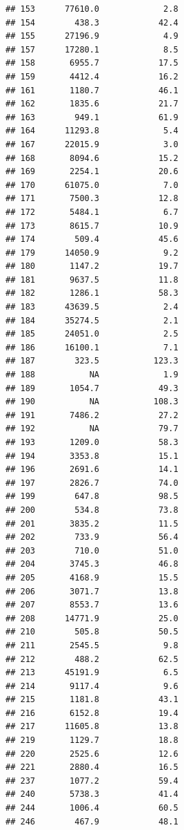 \documentclass{beamer}\usepackage{graphicx, color}
\makeatletter
\newenvironment{kframe}{%
 \def\at@end@of@kframe{}%
 \ifinner\ifhmode%
  \def\at@end@of@kframe{\end{minipage}}%
  \begin{minipage}{\columnwidth}%
 \fi\fi%
 \def\FrameCommand##1{\hskip\@totalleftmargin \hskip-\fboxsep
 \colorbox{shadecolor}{##1}\hskip-\fboxsep
     \hskip-\linewidth \hskip-\@totalleftmargin \hskip\columnwidth}%
 \MakeFramed {\advance\hsize-\width
   \@totalleftmargin\z@ \linewidth\hsize
   \@setminipage}}%
 {\par\unskip\endMakeFramed%
 \at@end@of@kframe}
\newenvironment{knitrout}{}{} %
\makeatother
\begin{document}
\begin{frame}
\begin{knitrout}
\begin{kframe}
\begin{verbatim}
## 153      77610.0             2.8
## 154        438.3            42.4
## 155      27196.9             4.9
## 157      17280.1             8.5
## 158       6955.7            17.5
## 159       4412.4            16.2
## 161       1180.7            46.1
## 162       1835.6            21.7
## 163        949.1            61.9
## 164      11293.8             5.4
## 167      22015.9             3.0
## 168       8094.6            15.2
## 169       2254.1            20.6
## 170      61075.0             7.0
## 171       7500.3            12.8
## 172       5484.1             6.7
## 173       8615.7            10.9
## 174        509.4            45.6
## 179      14050.9             9.2
## 180       1147.2            19.7
## 181       9637.5            11.8
## 182       1286.1            58.3
## 183      43639.5             2.4
## 184      35274.5             2.1
## 185      24051.0             2.5
## 186      16100.1             7.1
## 187        323.5           123.3
## 188           NA             1.9
## 189       1054.7            49.3
## 190           NA           108.3
## 191       7486.2            27.2
## 192           NA            79.7
## 193       1209.0            58.3
## 194       3353.8            15.1
## 196       2691.6            14.1
## 197       2826.7            74.0
## 199        647.8            98.5
## 200        534.8            73.8
## 201       3835.2            11.5
## 202        733.9            56.4
## 203        710.0            51.0
## 204       3745.3            46.8
## 205       4168.9            15.5
## 206       3071.7            13.8
## 207       8553.7            13.6
## 208      14771.9            25.0
## 210        505.8            50.5
## 211       2545.5             9.8
## 212        488.2            62.5
## 213      45191.9             6.5
## 214       9117.4             9.6
## 215       1181.8            43.1
## 216       6152.8            19.4
## 217      11605.8            13.8
## 219       1129.7            18.8
## 220       2525.6            12.6
## 221       2880.4            16.5
## 237       1077.2            59.4
## 240       5738.3            41.4
## 244       1006.4            60.5
## 246        467.9            48.1
\end{verbatim}
\end{kframe}
\end{knitrout}

\end{frame}
\end{document}

